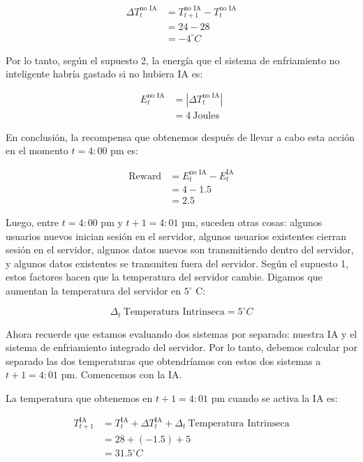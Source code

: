 \documentclass[
]{book}
\begin{document}
\begin{align*}
    \Delta T_t^{\textrm{no IA}}
    & = T_{t+1}^{\textrm{no IA}} - T_t^{\textrm{no IA}} \\
    & = 24 - 28 \\
    & = -4^{\circ} C
\end{align*}

Por lo tanto, según el supuesto 2, la energía que el sistema de enfriamiento no inteligente habría gastado si no hubiera IA es:

\begin{align*}
    E_t^{\textrm{no IA}}
    & = |\Delta T_t^{\textrm{no IA}}| \\
    & = 4 \ \textrm{Joules}
\end{align*}

En conclusión, la recompensa que obtenemos después de llevar a cabo esta acción en el momento \(t = 4: 00\) pm es:

\begin{align*}
    \textrm{Reward}
    & = E_t^{\textrm{no IA}} - E_t^{\textrm{IA}} \\
    & = 4 - 1.5 \\
    & = 2.5
\end{align*}

Luego, entre \(t = 4: 00\) pm y \(t + 1 = 4: 01\) pm, suceden otras cosas: algunos usuarios nuevos inician sesión en el servidor, algunos usuarios existentes cierran sesión en el servidor, algunos datos nuevos son transmitiendo dentro del servidor, y algunos datos existentes se transmiten fuera del servidor. Según el supuesto 1, estos factores hacen que la temperatura del servidor cambie. Digamos que aumentan la temperatura del servidor en \(5^{\circ}\) C:

\[\Delta_t \ \textrm{Temperatura Intrinseca} = 5^{\circ} C\]

Ahora recuerde que estamos evaluando dos sistemas por separado: nuestra IA y el sistema de enfriamiento integrado del servidor. Por lo tanto, debemos calcular por separado las dos temperaturas que obtendríamos con estos dos sistemas a \(t + 1 = 4: 01\) pm. Comencemos con la IA.

La temperatura que obtenemos en \(t + 1 = 4: 01\) pm cuando se activa la IA es:

\begin{align*}
    T_{t+1}^{\textrm{IA}}
    & = T_t^{\textrm{IA}} + \Delta T_t^{\textrm{IA}} + \Delta_t \ \textrm{Temperatura Intrinseca} \\
    & = 28 + (-1.5) + 5 \\
    & = 31.5^{\circ} C
\end{align*}
\end{document}
